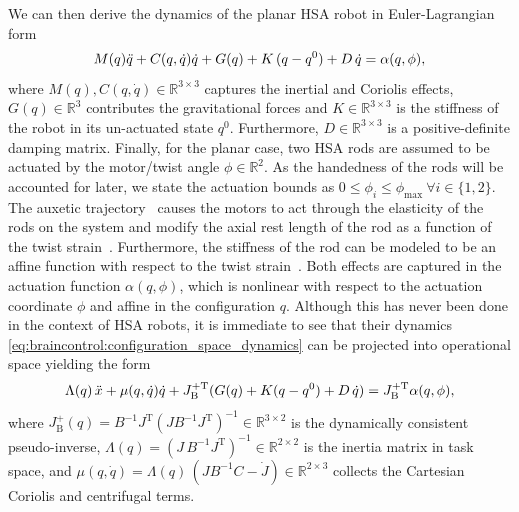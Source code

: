 We can then derive the dynamics of the planar \gls{HSA} robot in Euler-Lagrangian form
\begin{equation}\label{eq:braincontrol:configuration_space_dynamics}
    M(q) \Ddot{q} + C(q,\dot{q})\dot{q} + G(q) + K \, (q-q^0) + D \, \dot{q} = \alpha(q,\phi),
\end{equation}
where $M(q), C(q,\dot{q}) \in \mathbb{R}^{3 \times 3}$ captures the inertial and Coriolis effects, $G(q) \in \mathbb{R}^3$ contributes the gravitational forces and $K \in \mathbb{R}^{3 \times 3}$ is the stiffness of the robot in its un-actuated state $q^0$. Furthermore, $D \in \mathbb{R}^{3 \times 3}$ is a positive-definite damping matrix. Finally, for the planar case, two \gls{HSA} rods are assumed to be actuated by the motor/twist angle $\phi \in \mathbb{R}^2$. As the handedness of the rods will be accounted for later, we state the actuation bounds as $0 \leq \phi_i \leq \phi_\mathrm{max} \: \forall i \in \{ 1, 2 \}$.
The auxetic trajectory~\cite{good2022expanding} causes the motors to act through the elasticity of the rods on the system and modify the axial rest length of the rod as a function of the twist strain~\cite{stolzle2023modelling}.
Furthermore, the stiffness of the rod can be modeled to be an affine function with respect to the twist strain~\cite{good2022expanding, stolzle2023modelling}. Both effects are captured in the actuation function $\alpha(q,\phi)$, which is nonlinear with respect to the actuation coordinate $\phi$ and affine in the configuration $q$.
%
Although this has never been done in the context of HSA robots, it is immediate to see that their dynamics \eqref{eq:braincontrol:configuration_space_dynamics} can be projected into operational space yielding the form~\cite{della2019exact, della2020model} %
\begin{equation}\label{eq:braincontrol:operational_space_dynamics}
    \Lambda(q) \, \Ddot{x} + \mu(q,\dot{q}) \dot{q} + J_\mathrm{B}^{+\mathrm{T}} ( G(q) + K (q-q^0) + D \, \dot{q} ) = J_\mathrm{B}^{+\mathrm{T}} \alpha(q,\phi),
\end{equation}
where $J_\mathrm{B}^+(q) = B^{-1}J^\mathrm{T}(J B^{-1} J^\mathrm{T})^{-1} \in \mathbb{R}^{3\times2}$ is the dynamically consistent pseudo-inverse, $\Lambda(q) = (J \, B^{-1} J^\mathrm{T})^{-1} \in \mathbb{R}^{2 \times 2}$ is the inertia matrix in task space, and $\mu(q, \dot{q}) = \Lambda(q) \, (J B^{-1} C - \dot{J}) \in \mathbb{R}^{2 \times 3}$ collects the Cartesian Coriolis and centrifugal terms. %

